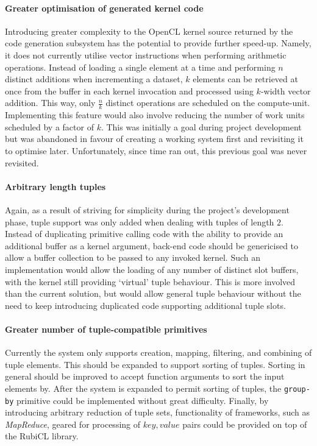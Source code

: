 \paragraph*{Greater optimisation of generated kernel code} Introducing greater complexity to the \ac{OpenCL} kernel source returned by the code generation subsystem has the potential to provide further speed-up. Namely, it does not currently utilise vector instructions when performing arithmetic operations. Instead of loading a single element at a time and performing $n$ distinct additions when incrementing a dataset, $k$ elements can be retrieved at once from the buffer in each kernel invocation and processed using $k$-width vector addition. This way, only $\frac{n}{k}$ distinct operations are scheduled on the compute-unit. Implementing this feature would also involve reducing the number of work units scheduled by a factor of $k$.
This was initially a goal during project development but was abandoned in favour of creating a working system first and revisiting it to optimise later. Unfortunately, since time ran out, this previous goal was never revisited.

\paragraph*{Arbitrary length tuples} Again, as a result of striving for simplicity during the project's development phase, tuple support was only added when dealing with tuples of length $2$. Instead of duplicating primitive calling code with the ability to provide an additional buffer as a kernel argument, back-end code should be genericised to allow a buffer collection to be passed to any invoked kernel.
Such an implementation would allow the loading of any number of distinct slot buffers, with the kernel still providing `virtual' tuple behaviour.
This is more involved than the current solution, but would allow general tuple behaviour without the need to keep introducing duplicated code supporting additional tuple slots.

\paragraph*{Greater number of tuple-compatible primitives} Currently the system only supports creation, mapping, filtering, and combining of tuple elements. This should be expanded to support sorting of tuples. Sorting in general should be improved to accept function arguments to sort the input elements by. After the system is expanded to permit sorting of tuples, the \verb|group-by| primitive could be implemented without great difficulty. Finally, by introducing arbitrary reduction of tuple sets, functionality of frameworks, such as \emph{MapReduce}, geared for processing of $key, value$ pairs could be provided on top of the RubiCL library.

